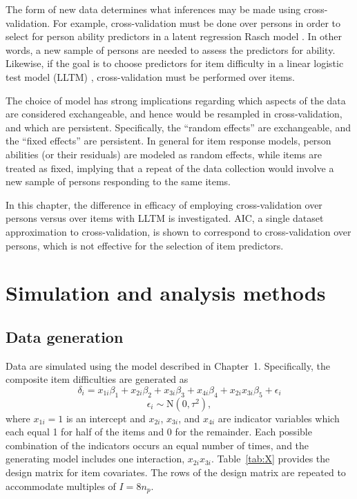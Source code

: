 \documentclass[12pt, letterpaper]{article}
\begin{document}
The form of new data determines what inferences may be made using cross-validation. For example, cross-validation must be done over persons in order to select for person ability predictors in a latent regression Rasch model \cite{}. In other words, a new sample of persons are needed to assess the predictors for ability. Likewise, if the goal is to choose predictors for item difficulty in a linear logistic test model (LLTM) \cite{}, cross-validation must be performed over items.

The choice of model has strong implications regarding which aspects of the data are considered exchangeable, and hence would be resampled in cross-validation, and which are persistent. Specifically, the ``random effects'' are exchangeable, and the ``fixed effects'' are persistent. In general for item response models, person abilities (or their residuals) are modeled as random effects, while items are treated as fixed, implying that a repeat of the data collection would involve a new sample of persons responding to the same items.

In this chapter, the difference in efficacy of employing cross-validation over persons versus over items with LLTM is investigated. AIC, a single dataset approximation to cross-validation, is shown to correspond to cross-validation over persons, which is not effective for the selection of item predictors.


\section{Simulation and analysis methods}

\subsection{Data generation}

Data are simulated using the model described in Chapter~1. 
Specifically, the composite item difficulties are generated as
\begin{equation}
	\delta_i = x_{1i}\beta_1 + x_{2i}\beta_2 + x_{3i}\beta_3 + x_{4i}\beta_4 + x_{2i}x_{3i}\beta_5 + \epsilon_i
\end{equation}
\begin{equation}
	\epsilon_i \sim \mathrm{N}(0, \tau^2)
,\end{equation}
where $x_{1i} = 1$ is an intercept and $x_{2i}$, $x_{3i}$, and $x_{4i}$ are indicator variables which each equal 1 for half of the items and 0 for the remainder. Each possible combination of the indicators occurs an equal number of times, and the generating model includes one interaction, $x_{2i}x_{3i}$. Table~\ref{tab:X} provides the design matrix for item covariates. The rows of the design matrix are repeated to accommodate multiples of $I = 8n_p$.
\end{document}
